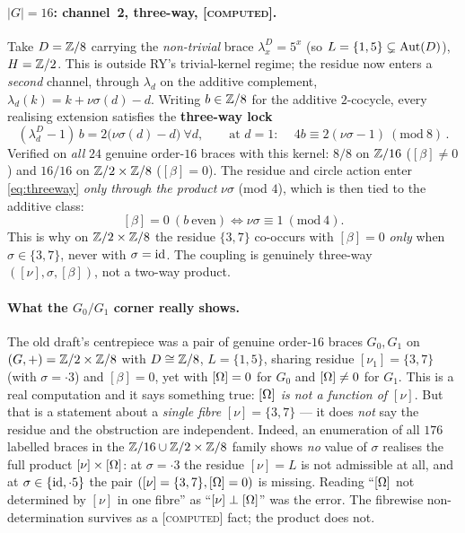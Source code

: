 \paragraph{$|G|=16$: channel~2, three-way, \textsc{[computed]}.}
Take $D=\mathbb{Z}/8$ carrying the \emph{non-trivial} brace $\lambda^D_x=5^x$ (so
$L=\{1,5\}\subsetneq\mathrm{Aut}(D)$), $H=\mathbb{Z}/2$. This is outside RY's trivial-kernel regime;
the residue now enters a \emph{second} channel, through $\lambda_d$ on the additive
complement, $\lambda_d(k)=k+\nu\sigma(d)-d$. Writing $b\in\mathbb{Z}/8$ for the additive
$2$-cocycle, every realising extension satisfies the \textbf{three-way lock}
\begin{equation}\label{eq:threeway}
(\lambda^D_d-1)\,b=2\big(\nu\sigma(d)-d\big)\ \forall d,
\qquad\text{at }d=1:\quad \boxed{\,4b\equiv 2(\nu\sigma-1)\ (\mathrm{mod}\ 8)\,}.
\end{equation}
Verified on \emph{all} $24$ genuine order-$16$ braces with this kernel: $8/8$ on
$\mathbb{Z}/16$ ($[\beta]\neq0$) and $16/16$ on $\mathbb{Z}/2\times\mathbb{Z}/8$ ($[\beta]=0$). The residue
and circle action enter \eqref{eq:threeway} \emph{only through the product}
$\nu\sigma$ (mod $4$), which is then tied to the additive class:
\[
   [\beta]=0\ (b\ \text{even})\iff\nu\sigma\equiv1\ (\mathrm{mod}\ 4).
\]
This is why on $\mathbb{Z}/2\times\mathbb{Z}/8$ the residue $\{3,7\}$ co-occurs with $[\beta]=0$
\emph{only} when $\sigma\in\{3,7\}$, never with $\sigma=\mathrm{id}$. The coupling is
genuinely three-way $([\nu],\sigma,[\beta])$, not a two-way product.

\paragraph{What the $G_0/G_1$ corner really shows.}
The old draft's centrepiece was a pair of genuine order-$16$ braces $G_0,G_1$ on
$(G,+)=\mathbb{Z}/2\times\mathbb{Z}/8$ with $D\cong\mathbb{Z}/8$, $L=\{1,5\}$, sharing residue
$[\nu_1]=\{3,7\}$ (with $\sigma=\cdot3$) and $[\beta]=0$, yet with $[\Omega]=0$ for $G_0$
and $[\Omega]\neq0$ for $G_1$. This is a real computation and it says something true:
\emph{$[\Omega]$ is not a function of $[\nu]$}. But that is a statement about a
\emph{single fibre} $[\nu]=\{3,7\}$ --- it does \emph{not} say the residue and the
obstruction are independent. Indeed, an enumeration of all $176$ labelled braces in
the $\mathbb{Z}/16\cup\mathbb{Z}/2\times\mathbb{Z}/8$ family shows \emph{no} value of $\sigma$ realises the
full product $[\nu]\times[\Omega]$: at $\sigma=\cdot3$ the residue $[\nu]=L$ is not
admissible at all, and at $\sigma\in\{\mathrm{id},\cdot5\}$ the pair $([\nu]=\{3,7\},[\Omega]=0)$
is missing. Reading ``$[\Omega]$ not determined by $[\nu]$ in one fibre'' as
``$[\nu]\perp[\Omega]$'' was the error. The fibrewise non-determination survives as a
\textsc{[computed]} fact; the product does not.


